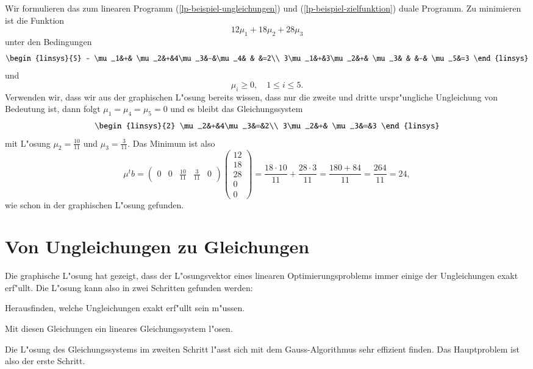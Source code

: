 \begin{beispiel}
Wir formulieren das zum linearen Programm
(\ref{lp-beispiel-ungleichungen})
und
(\ref{lp-beispiel-zielfunktion})
duale Programm. Zu minimieren ist die Funktion
\begin{equation}
12\mu_1+18\mu_2+28\mu_3
\label{dual-lp-zielfunktion}
\end{equation}
unter den Bedingungen
\begin{equation}
\begin{linsys}{5}
- \mu_1&+& \mu_2&+&4\mu_3&-&\mu_4& &      &=2\\
 3\mu_1&+&3\mu_2&+& \mu_3& &     &-& \mu_5&=3
\end{linsys}
\label{lp-dual-gleichungen}
\end{equation}
und
\begin{equation}
\mu_i\ge 0,\quad 1\le i\le 5.
\label{lp-dual-ungleichungen}
\end{equation}
Verwenden wir, dass wir aus der graphischen L"osung bereits wissen,
dass nur die zweite und dritte urspr"ungliche Ungleichung von Bedeutung
ist, dann folgt $\mu_1=\mu_4=\mu_5=0$ und es bleibt das Gleichungssystem
\[
\begin{linsys}{2}
 \mu_2&+&4\mu_3&=&2\\
3\mu_2&+& \mu_3&=&3
\end{linsys}
\]
mit L"osung $\mu_2=\frac{10}{11}$ und $\mu_3=\frac{3}{11}$.
Das Minimum ist also
\[
\mu^tb=\begin{pmatrix}0&0&\frac{10}{11}&\frac{3}{11}&0\end{pmatrix}
\begin{pmatrix}12\\18\\28\\0\\0\end{pmatrix}
=
\frac{18\cdot 10}{11}+\frac{28\cdot 3}{11}=\frac{180+84}{11}=\frac{264}{11}=24,
\]
wie schon in der graphischen L"osung gefunden.
\end{beispiel}

\section{Von Ungleichungen zu Gleichungen\label{lp:section:ungleichungen}}
Die graphische L"osung hat gezeigt, dass der L"osungsvektor eines
linearen Optimierungsproblems immer einige der Ungleichungen exakt
erf"ullt. Die L"osung kann also in zwei Schritten gefunden werden:
\begin{compactenum}
\item Herausfinden, welche Ungleichungen exakt erf"ullt sein m"ussen.
\item Mit diesen Gleichungen ein lineares Gleichungssystem l"osen.
\end{compactenum}
Die L"osung des Gleichungssystems im zweiten Schritt l"asst sich mit
dem Gauss-Algorithmus sehr effizient finden. Das Hauptproblem ist also
der erste Schritt.

